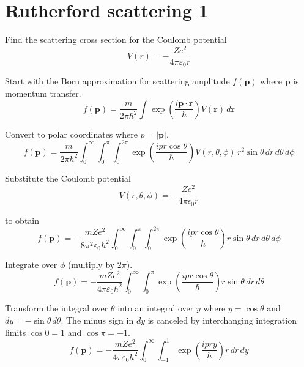 


\section*{Rutherford scattering 1}

Find the scattering cross section for the Coulomb potential
\begin{equation*}
V(r)=-\frac{Ze^2}{4\pi\varepsilon_0r}
\end{equation*}

Start with the Born approximation for scattering amplitude
$f(\mathbf p)$ where $\mathbf p$ is momentum transfer.
\begin{equation*}
f(\mathbf p)
=\frac{m}{2\pi\hbar^2}
\int\exp\left(\frac{i\mathbf p\cdot\mathbf r}{\hbar}\right)V(\mathbf r)\,d\mathbf r
\end{equation*}

Convert to polar coordinates where $p=|\mathbf p|$.
\begin{equation*}
f(\mathbf p)
=\frac{m}{2\pi\hbar^2}
\int_0^\infty
\int_0^\pi
\int_0^{2\pi}
\exp\left(\frac{ipr\cos\theta}{\hbar}\right)V(r,\theta,\phi)
\,r^2\sin\theta\,dr\,d\theta\,d\phi
\end{equation*}

Substitute the Coulomb potential
\begin{equation*}
V(r,\theta,\phi)=-\frac{Ze^2}{4\pi\epsilon_0r}
\end{equation*}

to obtain
\begin{equation*}
f(\mathbf p)
=-\frac{mZe^2}{8\pi^2\varepsilon_0\hbar^2}
\int_0^\infty
\int_0^\pi
\int_0^{2\pi}
\exp\left(\frac{ipr\cos\theta}{\hbar}\right)
r\sin\theta\,dr\,d\theta\,d\phi
\end{equation*}

Integrate over $\phi$ (multiply by $2\pi$).
\begin{equation*}
f(\mathbf p)
=-\frac{mZe^2}{4\pi\varepsilon_0\hbar^2}
\int_0^\infty
\int_0^\pi
\exp\left(\frac{ipr\cos\theta}{\hbar}\right)
r\sin\theta\,dr\,d\theta
\end{equation*}

Transform the integral over $\theta$ into an integral over $y$
where $y=\cos\theta$ and $dy=-\sin\theta\,d\theta$.
The minus sign in $dy$ is canceled by interchanging integration limits
$\cos0=1$ and $\cos\pi=-1$.
\begin{equation*}
f(\mathbf p)
=-\frac{mZe^2}{4\pi\varepsilon_0\hbar^2}
\int_0^\infty
\int_{-1}^1
\exp\left(\frac{ipry}{\hbar}\right)
r\,dr\,dy
\end{equation*}

